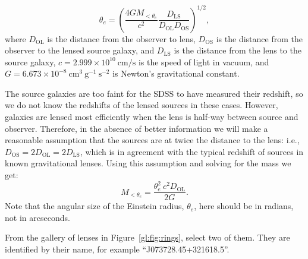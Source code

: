 \begin{equation}
\theta_e=\left(\frac{4GM_{<\theta_e}}{c^2}\frac{D_\textrm{LS}}{D_\textrm{OL}D_\textrm{OS}}\right)^{1/2},
\label{eqtheta_e}
\end{equation}
where $D_\textrm{OL}$ is the distance from the observer to lens, $D_\textrm{OS}$ is the distance from the observer to the lensed source galaxy, and $D_\textrm{LS}$ is the distance from the lens to the source galaxy, $c=2.999\times 10^{10}\:\textrm{cm}/\textrm{s}$ is the speed of light in vacuum, and $G=6.673\times 10^{-8}\:\textrm{cm}^3\:\textrm{g}^{-1}\:\textrm{s}^{-2}$ is Newton's gravitational constant. 

The source galaxies are too faint for the SDSS to have measured their
redshift, so we do not know the redshifts of the lensed sources in
these cases. However, galaxies are lensed most efficiently when the
lens is half-way between source and observer.
Therefore, in the absence of better information we will make
a reasonable assumption that the sources are at twice the distance to
the lens: i.e., $D_\textrm{OS}=2D_\textrm{OL}=2D_\textrm{LS}$, which is in
agreement with the typical redshift of sources in known gravitational
lenses. Using this assumption and solving for the mass we get:
\begin{equation}
M_{<\theta_e}=\frac{\theta_e^2 \: c^2 D_\textrm{OL}}{2G}.
\label{eqmass}
\end{equation}
Note that the angular size of the Einstein radius, $\theta_e$, here should be in radians, not in arcseconds.  

\begin{steps}
	\item From the gallery of lenses in Figure~\ref{gl:fig:rings},
select two of them. They are identified by their name, for example ``J073728.45+321618.5''.
	

\end{steps}



